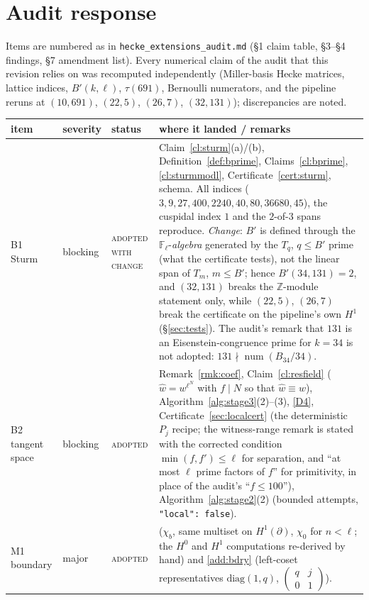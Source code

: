 \documentclass[11pt]{article}
\theoremstyle{remark}
\newcommand{\F}{\mathbb{F}}
\newcommand{\Z}{\mathbb{Z}}
\newcommand{\Fl}{\F_\ell}
\DeclareMathOperator{\num}{num}
\newcommand{\HA}[1]{[C,~\texttt{#1}]}      %
\begin{document}
\section{Audit response}\label{app:audit}
Items are numbered as in \texttt{hecke\_extensions\_audit.md} (\S1 claim table, \S3--\S4
findings, \S7 amendment list). Every numerical claim of the audit that this revision relies
on was recomputed independently (Miller-basis Hecke matrices, lattice indices, $B'(k,\ell)$,
$\tau(691)$, Bernoulli numerators, and the pipeline reruns at $(10,691)$, $(22,5)$, $(26,7)$,
$(32,131)$); discrepancies are noted.
\begin{center}\footnotesize
\begin{longtable}{@{}>{\raggedright\arraybackslash}p{1.6cm}>{\raggedright\arraybackslash}p{1.4cm}>{\raggedright\arraybackslash}p{2.3cm}>{\raggedright\arraybackslash}p{10.2cm}@{}}
\toprule
item & severity & status & where it landed / remarks \\
\midrule
\endhead
B1 Sturm & blocking & \textsc{adopted with change} & Claim~\ref{cl:sturm}(a)/(b), Definition~\ref{def:bprime}, Claims~\ref{cl:bprime}, \ref{cl:sturmmodl}, Certificate~\ref{cert:sturm}, schema. All indices ($3,9,27,400,2240,40,80,36680,45$), the cuspidal index $1$ and the $2$-of-$3$ spans reproduce. \emph{Change}: $B'$ is defined through the $\Fl$-\emph{algebra} generated by the $T_q$, $q\le B'$ prime (what the certificate tests), not the linear span of $T_m$, $m\le B'$; hence $B'(34,131)=2$, and $(32,131)$ breaks the $\Z$-module statement only, while $(22,5)$, $(26,7)$ break the certificate on the pipeline's own $H^1$ (\S\ref{sec:tests}). The audit's remark that $131$ is an Eisenstein-congruence prime for $k=34$ is not adopted: $131\nmid\num(B_{34}/34)$. \\
B2 tangent space & blocking & \textsc{adopted} & Remark~\ref{rmk:coef}, Claim~\ref{cl:resfield} ($\hat w=w^{\ell^N}$ with $f\mid N$ so that $\hat w\equiv w$), Algorithm~\ref{alg:stage3}(2)--(3), \ref{D4}, Certificate~\ref{sec:localcert} (the deterministic $P_j$ recipe; the witness-range remark is stated with the corrected condition $\min(f,f')\le\ell$ for separation, and ``at most $\ell$ prime factors of $f$'' for primitivity, in place of the audit's ``$f\le100$''), Algorithm~\ref{alg:stage2}(2) (bounded attempts, \texttt{"local": false}). \\
M1 boundary & major & \textsc{adopted} & \HA{cl:chi} ($\chi_b$, same multiset on $H^1(\partial)$, $\chi_0$ for $n<\ell$; the $H^0$ and $H^1$ computations re-derived by hand) and \ref{add:bdry} (left-coset representatives $\mathrm{diag}(1,q)$, $(\begin{smallmatrix}q&j\\0&1\end{smallmatrix})$). \\

\end{longtable}
\end{center}
\end{document}

